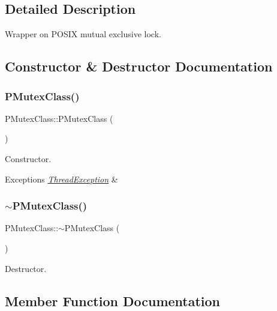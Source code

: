 \subsection{Detailed Description}
Wrapper on P\+O\+S\+IX mutual exclusive lock. 

\subsection{Constructor \& Destructor Documentation}
\mbox{\label{classPMutexClass_a688e581b72b3b5315e7b2a36d1c251a1}} 
\subsubsection{\texorpdfstring{P\+Mutex\+Class()}{PMutexClass()}}
{\footnotesize\ttfamily P\+Mutex\+Class\+::\+P\+Mutex\+Class (\begin{DoxyParamCaption}{ }\end{DoxyParamCaption})\hspace{0.3cm}{\ttfamily [noexcept]}}

Constructor. 
\begin{DoxyExceptions}{Exceptions}
{\em \hyperlink{classThreadException}{Thread\+Exception}} & \\
\hline
\end{DoxyExceptions}
\mbox{\label{classPMutexClass_aa323680c6acc1f99f96489856c115768}} 
\subsubsection{\texorpdfstring{$\sim$\+P\+Mutex\+Class()}{~PMutexClass()}}
{\footnotesize\ttfamily P\+Mutex\+Class\+::$\sim$\+P\+Mutex\+Class (\begin{DoxyParamCaption}{ }\end{DoxyParamCaption})\hspace{0.3cm}{\ttfamily [virtual]}}



Destructor. 



\subsection{Member Function Documentation}
\mbox{\label{classPMutexClass_a6fb1831791f79d71be6fb4d4bb5b887e}} 
